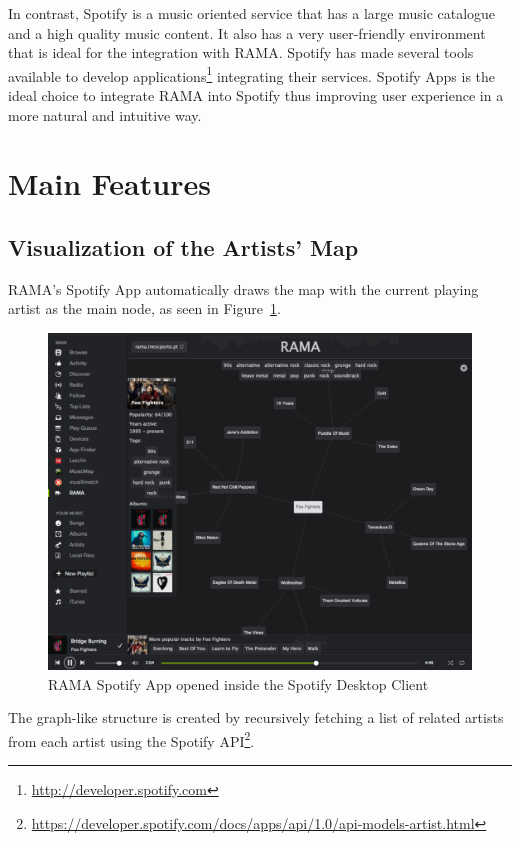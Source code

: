 \documentclass{article}
\begin{document}
    In contrast, Spotify is a music oriented service that has a large music catalogue and a high quality music content.
    It also has a very user-friendly environment that is ideal for the integration with RAMA.
    Spotify has made several tools available to develop applications\footnote{\url{http://developer.spotify.com}} integrating their services.
    Spotify Apps is the ideal choice to integrate RAMA into Spotify thus improving user experience in a more natural and intuitive way.

  \section{Main Features}
  \label{sec:features}

    \subsection{Visualization of the Artists' Map}
    \label{sub:visualization}

      RAMA's Spotify App automatically draws the map with the current playing artist as the main node, as seen in Figure~\ref{fig:spotify_app}.
      \begin{figure}[hb]
        \begin{center}
          \includegraphics[width=\columnwidth]{../report/figures/graph_rootnode.pdf}
        \end{center}
        \caption{RAMA Spotify App opened inside the Spotify Desktop Client}
        \label{fig:spotify_app}
      \end{figure}
      The graph-like structure is created by recursively fetching a list of related artists from each artist using the Spotify API\footnote{\url{https://developer.spotify.com/docs/apps/api/1.0/api-models-artist.html}}.
\end{document}
